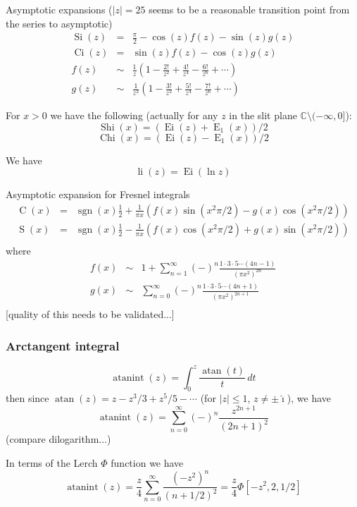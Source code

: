 \documentclass[10pt,dvipdfmx,letterpaper,twoside]{article}
\DeclareMathOperator{\atan}{atan}
\let\O=\operatorname
\newcommand{\CC}{{\mathbb{C}}}
\newcommand{\ii}{{\hat{\imath}}}
\begin{document}
Asymptotic expansions ($|z|=25$ seems to be a reasonable transition point from the series to asymptotic)
\begin{eqnarray*}
\O{Si}(z) &=& \frac\pi2 - \cos(z) f(z) - \sin(z) g(z) \\
\O{Ci}(z) &=& \sin(z) f(z) - \cos(z) g(z) \\
f(z) &\sim& \frac1z\left(1 - \frac{2!}{z^2} + \frac{4!}{z^4} - \frac{6!}{z^6} + \cdots \right) \\
g(z) &\sim& \frac1{z^2}\left(1 - \frac{3!}{z^2} + \frac{5!}{z^4} - \frac{7!}{z^6} + \cdots \right)
\end{eqnarray*}

For $x>0$ we have the following (actually for any $z$ in the slit plane $\CC\setminus(-\infty,0]$):
\[ \O{Shi}(x) = (\O{Ei}(z) + \O{E}_1(x))/2 \]
\[ \O{Chi}(x) = (\O{Ei}(z) - \O{E}_1(x))/2 \]

We have
\[ \O{li}(z) = \O{Ei}(\ln z) \]

Asymptotic expansion for Fresnel integrals
\begin{eqnarray*}
\O{C}(x) &=& \O{sgn}(x)\frac12 + \frac{1}{\pi x}\left( f(x)\sin(x^2\pi/2) - g(x)\cos(x^2\pi/2) \right) \\
\O{S}(x) &=& \O{sgn}(x)\frac12 - \frac{1}{\pi x}\left( f(x)\cos(x^2\pi/2) + g(x)\sin(x^2\pi/2) \right) \\
\end{eqnarray*}
where
\begin{eqnarray*}
f(x) &\sim& 1 + \sum_{n=1}^\infty (-)^n \frac{1\cdot3\cdot5\cdots(4n-1)}{(\pi x^2)^{2n  }} \\
g(x) &\sim&     \sum_{n=0}^\infty (-)^n \frac{1\cdot3\cdot5\cdots(4n+1)}{(\pi x^2)^{2n+1}} \\
\end{eqnarray*}
[quality of this needs to be validated...]

\subsubsection{Arctangent integral}

\[ \O{atanint}(z) = \int_0^z\frac{\atan(t)}{t}\,dt \]
then since $\atan(z)=z-z^3/3+z^5/5-\cdots$ (for $|z|\leq1$, $z\neq\pm\ii$), we have
\[ \O{atanint}(z) = \sum_{n=0}^\infty(-)^n\frac{z^{2n+1}}{(2n+1)^2} \]
(compare dilogarithm...)

In terms of the Lerch $\Phi$ function we have
\[ \O{atanint}(z) = \frac{z}{4}\sum_{n=0}^\infty\frac{(-z^2)^n}{(n+1/2)^2} = \frac{z}{4}\Phi[-z^2, 2, 1/2] \]
\end{document}
